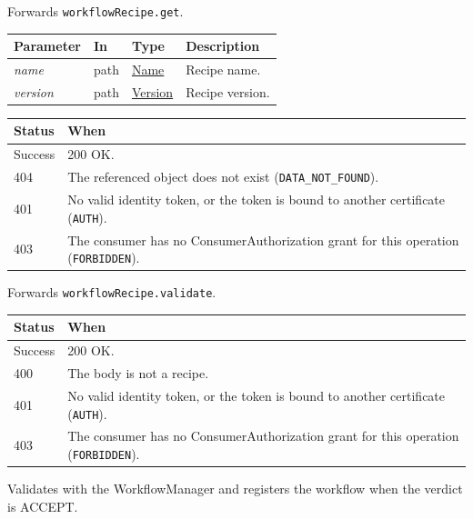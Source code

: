 \documentclass[a4paper]{arrowhead}
\newcommand{\fparam}[1]{\textit{\textcolor{ArrowheadBlue}{#1}}}
\newcommand{\pref}[1]{{\textcolor{ArrowheadGrey}{\hyperref[sec:model:primitives:#1]{#1}}}}
\begin{document}
Forwards \texttt{workflowRecipe.get}.

{\small
\begin{longtable}{|p{3.0cm}|p{1.4cm}|p{3.2cm}|p{8.2cm}|}

\hline
\rowcolor{gray!33} Parameter & In & Type & Description \\ \hline
\endhead
\fparam{name} & path & \pref{Name} & Recipe name. \\ \hline
\fparam{version} & path & \pref{Version} & Recipe version. \\ \hline
\end{longtable}
}


{\small
\begin{longtable}{|p{2.0cm}|p{13.8cm}|}

\hline
\rowcolor{gray!33} Status & When \\ \hline
\endhead
Success & 200 OK. \\ \hline
404 & The referenced object does not exist (\texttt{DATA\_NOT\_FOUND}). \\ \hline
401 & No valid identity token, or the token is bound to another certificate (\texttt{AUTH}). \\ \hline
403 & The consumer has no ConsumerAuthorization grant for this operation (\texttt{FORBIDDEN}). \\ \hline
\end{longtable}
}

Forwards \texttt{workflowRecipe.validate}.

{\small
\begin{longtable}{|p{2.0cm}|p{13.8cm}|}

\hline
\rowcolor{gray!33} Status & When \\ \hline
\endhead
Success & 200 OK. \\ \hline
400 & The body is not a recipe. \\ \hline
401 & No valid identity token, or the token is bound to another certificate (\texttt{AUTH}). \\ \hline
403 & The consumer has no ConsumerAuthorization grant for this operation (\texttt{FORBIDDEN}). \\ \hline
\end{longtable}
}

Validates with the WorkflowManager and registers the workflow when the verdict is ACCEPT.
\end{document}
